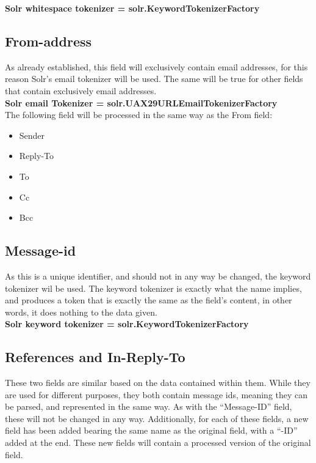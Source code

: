 \documentclass[a4paper,english]{report}
\begin{document}
\textbf{Solr whitespace tokenizer = solr.KeywordTokenizerFactory}\\

\noindent
\subsection{From-address}
As already established, this field will exclusively contain email addresses, for this reason Solr’s email tokenizer will be used. The same will be true for other fields that contain exclusively email addresses.\\

\textbf{Solr email Tokenizer = solr.UAX29URLEmailTokenizerFactory}\\

\noindent
The following field will be processed in the same way as the From field:

\begin{itemize}
\item Sender
\item Reply-To
\item To
\item Cc
\item Bcc\\
\end{itemize}

\noindent
\subsection{Message-id} 
As this is a unique identifier, and should not in any way be changed, the keyword tokenizer wil be used. The keyword tokenizer is exactly what the name implies, and produces a token that is exactly the same as the field's content, in other words, it does nothing to the data given.\\

\textbf{Solr keyword tokenizer = solr.KeywordTokenizerFactory}\\


\noindent
\subsection{References and In-Reply-To}
These two fields are similar based on the data contained within them. While they are used for different purposes, they both contain message ids, meaning they can be parsed, and represented in the same way. As with the “Message-ID” field, these will not be changed in any way. Additionally, for each of these fields, a new field has been added bearing the same name as the original field, with a “-ID” added at the end. These new fields will contain a processed version of the original field.\\
\end{document}

